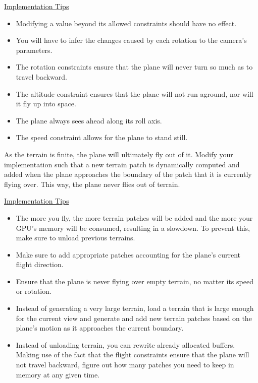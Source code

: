 \documentclass[addpoints]{exam}
\begin{document}
\begin{questions}
    \noindent\underline{Implementation Tips}
    \begin{itemize}
    \item Modifying a value beyond its allowed constraints should have no effect.
    \item You will have to infer the changes caused by each rotation to the camera's parameters.
    \item The rotation constraints ensure that the plane will never turn so much as to travel backward.
    \item The altitude constraint ensures that the plane will not run aground, nor will it fly up into space.
    \item The plane always sees ahead along its roll axis.
    \item The speed constraint allows for the plane to stand still.
    \end{itemize}

    

    As the terrain is finite, the plane will ultimately fly out of it. Modify your implementation such that a new terrain patch is dynamically computed and added when the plane approaches the boundary of the patch that it is currently flying over. This way, the plane never flies out of terrain.

    \noindent\underline{Implementation Tips}
    \begin{itemize}
    \item The more you fly, the more terrain patches will be added and the more your GPU's memory will be consumed, resulting in a slowdown. To prevent this, make sure to unload previous terrains.
    \item Make sure to add appropriate patches accounting for the plane's current flight direction. 
    \item Ensure that the plane is never flying over empty terrain, no matter its speed or rotation.
    \item Instead of generating a very large terrain, load a terrain that is large enough for the current view and generate and add new terrain patches based on the plane's motion as it approaches the current boundary.
    \item Instead of unloading terrain, you can rewrite already allocated buffers. Making use of the fact that the flight constraints ensure that the plane will not travel backward, figure out how many patches you need to keep in memory at any given time.
    \end{itemize}
    

\end{questions}
\end{document}
